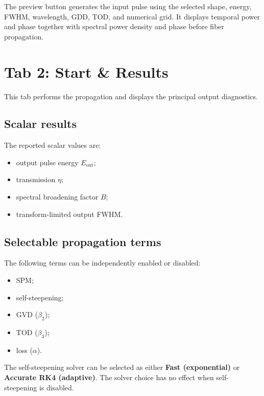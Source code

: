 \documentclass[11pt,a4paper]{article}
\begin{document}
The preview button generates the input pulse using the selected shape, energy,
FWHM, wavelength, GDD, TOD, and numerical grid. It displays temporal power and
phase together with spectral power density and phase before fiber propagation.

\section{Tab 2: Start \& Results}

This tab performs the propagation and displays the principal output diagnostics.

\subsection{Scalar results}

The reported scalar values are:

\begin{itemize}
    \item output pulse energy $E_{\mathrm{out}}$;
    \item transmission $\eta$;
    \item spectral broadening factor $B$;
    \item transform-limited output FWHM.
\end{itemize}

\subsection{Selectable propagation terms}

The following terms can be independently enabled or disabled:

\begin{itemize}
    \item SPM;
    \item self-steepening;
    \item GVD ($\beta_2$);
    \item TOD ($\beta_3$);
    \item loss ($\alpha$).
\end{itemize}

The self-steepening solver can be selected as either \textbf{Fast
(exponential)} or \textbf{Accurate RK4 (adaptive)}. The solver choice has no
effect when self-steepening is disabled.
\end{document}
